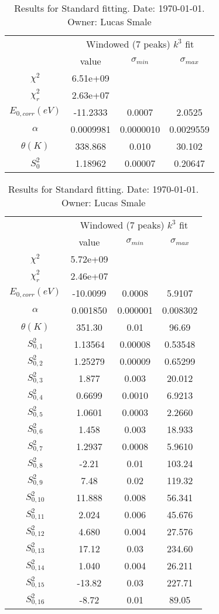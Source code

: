 \documentclass{article}
\begin{document}
\begin{landscape}
\begin{table}[ht]
\centering
\begin{tabular}{c||c|c|c}
\hline
&\multicolumn{3}{|c}{Windowed (7 peaks) $k^{3}$ fit}\\
& value & $\sigma_{min}$ & $\sigma_{max}$\\
\hline
$\chi^2$   & 6.51e+09 & & \\
$\chi^2_r$ & 2.63e+07 & & \\
\hline
$E_{0,corr} (eV)$& -11.2333 & 0.0007 & 2.0525 \\
$\alpha $       & 0.0009981 & 0.0000010 & 0.0029559 \\
$\theta (K) $   & 338.868 & 0.010 & 30.102 \\
$S^2_{0}$& 1.18962 & 0.00007 & 0.20647 \\
\hline
    \end{tabular}
    \caption{Results for Standard fitting. Date: \today. Owner: Lucas Smale}
\end{table}
\begin{table}[ht]
\centering
\begin{tabular}{c||c|c|c}
\hline
&\multicolumn{3}{|c}{Windowed (7 peaks) $k^{3}$ fit}\\
& value & $\sigma_{min}$ & $\sigma_{max}$\\
\hline
$\chi^2$   & 5.72e+09 & & \\
$\chi^2_r$ & 2.46e+07 & & \\
\hline
$E_{0,corr} (eV)$& -10.0099 & 0.0008 & 5.9107 \\
$\alpha $       & 0.001850 & 0.000001 & 0.008302 \\
$\theta (K) $   & 351.30 & 0.01 & 96.69 \\
$S^2_{0,1}$& 1.13564 & 0.00008 & 0.53548 \\
$S^2_{0,2}$& 1.25279 & 0.00009 & 0.65299 \\
$S^2_{0,3}$& 1.877 & 0.003 & 20.012 \\
$S^2_{0,4}$& 0.6699 & 0.0010 & 6.9213 \\
$S^2_{0,5}$& 1.0601 & 0.0003 & 2.2660 \\
$S^2_{0,6}$& 1.458 & 0.003 & 18.933 \\
$S^2_{0,7}$& 1.2937 & 0.0008 & 5.9610 \\
$S^2_{0,8}$& -2.21 & 0.01 & 103.24 \\
$S^2_{0,9}$& 7.48 & 0.02 & 119.32 \\
$S^2_{0,10}$& 11.888 & 0.008 & 56.341 \\
$S^2_{0,11}$& 2.024 & 0.006 & 45.676 \\
$S^2_{0,12}$& 4.680 & 0.004 & 27.576 \\
$S^2_{0,13}$& 17.12 & 0.03 & 234.60 \\
$S^2_{0,14}$& 1.040 & 0.004 & 26.211 \\
$S^2_{0,15}$& -13.82 & 0.03 & 227.71 \\
$S^2_{0,16}$& -8.72 & 0.01 & 89.05 \\
\hline
    \end{tabular}
    \caption{Results for Standard fitting. Date: \today. Owner: Lucas Smale}
\end{table}
\end{landscape}
\end{document}
